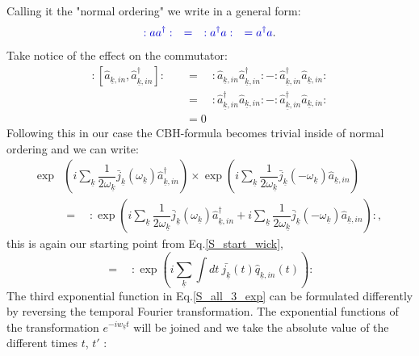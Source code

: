 \documentclass[12pt, titlepage]{article}
\begin{document}
Calling it the "normal ordering" we write in a general form:
\begin{equation}
\textcolor[RGB]{0,0,204}{
: a a^{\dagger} : 
\quad
=\quad
: a^{\dagger} a :
\quad
=
a^{\dagger} a
}.
\end{equation}
Take notice of the effect on the commutator:
\begin{equation}
\begin{split}
: \left[
\hat{a}_{\underline{k},in}
,
\hat{a}^{\dagger}_{\underline{k},in}
 \right] : 
 \quad
 &=
 \quad
 : 
\hat{a}_{\underline{k},in}
\hat{a}^{\dagger}_{\underline{k},in}
:
-
:
\hat{a}^{\dagger}_{\underline{k},in}
\hat{a}_{\underline{k},in}
  : 
  \\
  &=
 \quad
 : 
\hat{a}^{\dagger}_{\underline{k},in}
\hat{a}_{\underline{k},in}
:
-
:
\hat{a}^{\dagger}_{\underline{k},in}
\hat{a}_{\underline{k},in}
  : 
   \\
 &=0
 \end{split}
\end{equation}
Following this in our case the CBH-formula becomes trivial inside of normal ordering and we can write:
\begin{equation}
\begin{split}
\exp &
    \left(
       i
    \sum_{\underline{k}}
     	\dfrac{1}{2\omega_{\underline{k}}}
     	 \bar{j}_{\underline{k}}(\omega_{\underline{k}})
			\hat{a}^{\dagger}_{\underline{k},in}     
    \right)
    \times
        \exp
    \left(
     	  i
    	\sum_{\underline{k}}
     	\dfrac{1}{2\omega_{\underline{k}}}
      \bar{j}_{\underline{k}}(-\omega_{\underline{k}})
			\hat{a}_{\underline{k},in}  		
    \right)
	\\   
    &=
	\quad
	:
	\exp
    \left(
       i
    \sum_{\underline{k}}
     	\dfrac{1}{2\omega_{\underline{k}}}
     	 \bar{j}_{\underline{k}}(\omega_{\underline{k}})
			\hat{a}^{\dagger}_{\underline{k},in}     
		+
     	  i
    	\sum_{\underline{k}}
     	\dfrac{1}{2\omega_{\underline{k}}}
      \bar{j}_{\underline{k}}(-\omega_{\underline{k}})
			\hat{a}_{\underline{k},in}  		
    \right)
	:    
    ,
\end{split}
\end{equation}
this is again our starting point from Eq.\enskip\eqref{S_start_wick},
\begin{equation}\label{1_term_wick}
=
\quad
:
\exp
    \left(
    i
    \sum_{\underline{k}}\int dt \ \bar{j_{\underline{k}}}(t) \hat{q}_{\underline{k},in}(t) 
    \right)
    :  
\end{equation}
The third exponential function in Eq.\enskip\eqref{S_all_3_exp} can be formulated differently by reversing the temporal Fourier transformation. The exponential functions of the transformation $ e^{-iw_{\underline{k}}t} $ will be joined and we take the absolute value of the different times $ t $, $ t' $ :
\end{document}
